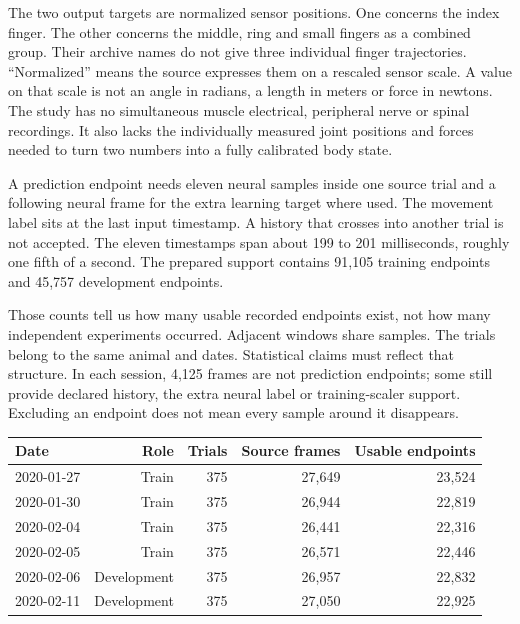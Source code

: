 The two output targets are normalized sensor positions. One concerns the index
finger. The other concerns the middle, ring and small fingers as a combined
group. Their archive names do not give three individual finger trajectories.
``Normalized'' means the source expresses them on a rescaled sensor scale.
A value on that scale is not an angle in radians, a length in meters or force
in newtons. The study has no simultaneous muscle electrical, peripheral nerve
or spinal recordings. It also lacks the individually measured joint positions
and forces needed to turn two numbers into a fully calibrated body state.

A prediction endpoint needs eleven neural samples inside one source trial and
a following neural frame for the extra learning target where used. The movement
label sits at the last input timestamp. A history that crosses into another
trial is not accepted. The eleven timestamps span about 199 to 201 milliseconds,
roughly one fifth of a second. The prepared support contains 91,105 training
endpoints and 45,757 development endpoints.

Those counts tell us how many usable recorded endpoints exist, not how many
independent experiments occurred. Adjacent windows share samples. The trials
belong to the same animal and dates. Statistical claims must reflect that
structure. In each session, 4,125 frames are not prediction endpoints; some
still provide declared history, the extra neural label or training-scaler support.
Excluding an endpoint does not mean every sample around it disappears.

\begin{center}
\begin{minipage}{\linewidth}
\centering\small
\begin{tabular}{lrrrr}
\toprule Date & Role & Trials & Source frames & Usable endpoints\\\midrule
2020-01-27 & Train &375&27,649&23,524\\
2020-01-30 & Train &375&26,944&22,819\\
2020-02-04 & Train &375&26,441&22,316\\
2020-02-05 & Train &375&26,571&22,446\\
2020-02-06 & Development &375&26,957&22,832\\
2020-02-11 & Development &375&27,050&22,925\\\bottomrule
\end{tabular}
\end{minipage}
\end{center}

